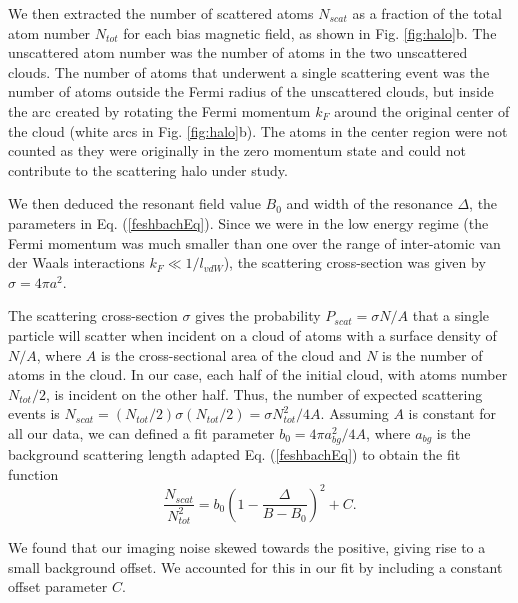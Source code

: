 \documentclass[12pt]{iopart}
\begin{document}
\par We then extracted the number of scattered atoms $N_{scat}$ as a fraction of the total atom number $N_{tot}$ for each bias magnetic field, as shown in Fig. \ref{fig:halo}b. The unscattered atom number was the number of atoms in the two unscattered clouds. The number of atoms that underwent a single scattering event was the number of atoms outside the Fermi radius of the unscattered clouds, but inside the arc created by rotating the Fermi momentum $k_F$ around the original center of the cloud (white arcs in Fig. \ref{fig:halo}b). The atoms in the center region were not counted as they were originally in the zero momentum state and could not contribute to the scattering halo under study. 
\par We then deduced the resonant field value $B_0$ and width of the resonance  $\Delta$, the parameters in Eq. (\ref{feshbachEq}).  Since we were in the low energy regime (the Fermi momentum was much smaller than one over the range of inter-atomic van der Waals interactions $k_F\ll1/l_{vdW}$), the scattering cross-section was given by $\sigma=4\pi a^2$. 
\par The scattering cross-section $\sigma$ gives the probability $P_{scat}=\sigma N/A$ that a single particle will scatter when incident on a cloud of atoms with a surface density of $N/A$, where $A$ is the cross-sectional area of the cloud and $N$ is the number of atoms in the cloud. In our case, each half of the initial cloud, with atoms number $N_{tot}/2$, is incident on the other half. Thus, the number of expected scattering events is $N_{scat}= (N_{tot}/2) \sigma  (N_{tot}/2)=\sigma N_{tot}^2/4A$. Assuming $A$ is constant for all our data, we can defined a fit parameter $b_0=4\pi a_{bg}^2/4A$, where $a_{bg}$ is the background scattering length adapted Eq. (\ref{feshbachEq}) to obtain the fit function
\begin{equation}
\frac{N_{scat}}{N_{tot}^2}=b_0\left(1-\frac{\Delta}{B-B_0}\right)^2 + C.
\label{eq:fit}
\end{equation}
\par We found that our imaging noise skewed towards the positive, giving rise to a small background offset. We accounted for this in our fit by including a constant offset parameter $C$. 
\end{document}
